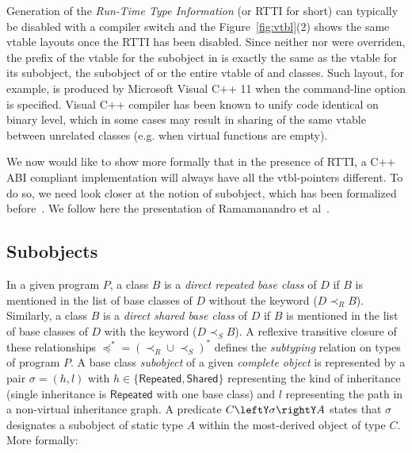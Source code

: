 Generation of the \emph{Run-Time Type Information} (or RTTI for short) can 
typically be disabled with a compiler switch and the Figure~\ref{fig:vtbl}(2) 
shows the same vtable layouts once the RTTI has been disabled. Since neither 
 nor  were overriden, the prefix of the vtable for the 
 subobject in  is exactly the same as the vtable for its 
 subobject, the  subobject of  or the entire vtable of 
 and  classes. Such layout, for example, is produced by 
Microsoft Visual C++ 11 when the command-line option  is specified. 
Visual C++ compiler has been known to unify code identical on binary level, 
which in some cases may result in sharing of the same vtable between unrelated 
classes (e.g. when virtual functions are empty).


We now would like to show more formally that in the presence of RTTI, a C++ ABI 
compliant implementation will always have all the vtbl-pointers different. To do 
so, we need look closer at the notion of subobject, which has been formalized 
before~\cite{RF95,WNST06,RDL11}. We follow here the presentation of Ramamanandro 
et al~\cite{RDL11}.

\subsection{Subobjects}
\label{sec:subobj}

In a given program $P$, a class $B$ is a \emph{direct repeated base class} of 
$D$ if $B$ is mentioned in the list of base classes of $D$ without the 
 keyword ($D \prec_R B$). Similarly, a class $B$ is a \emph{direct 
shared base class} of $D$ if $B$ is mentioned in the list of base classes of $D$ 
with the  keyword ($D \prec_S B$). A reflexive transitive closure 
of these relationships $\preceq^*=(\prec_R \cup \prec_S)^*$ defines the 
\emph{subtyping} relation on types of program $P$.
A base class \emph{subobject} of a given \emph{complete object} is represented by a pair 
$\sigma = (h,l)$ with $h \in \{\mathsf{Repeated},\mathsf{Shared}\}$ representing the 
kind of inheritance (single inheritance is $\mathsf{Repeated}$ with one base class) and $l$ 
representing the path in a non-virtual inheritance graph.
A predicate $C\leftY\sigma\rightY A$ states that $\sigma$ 
designates a subobject of static type $A$ within the most-derived object of 
type $C$. More formally:

